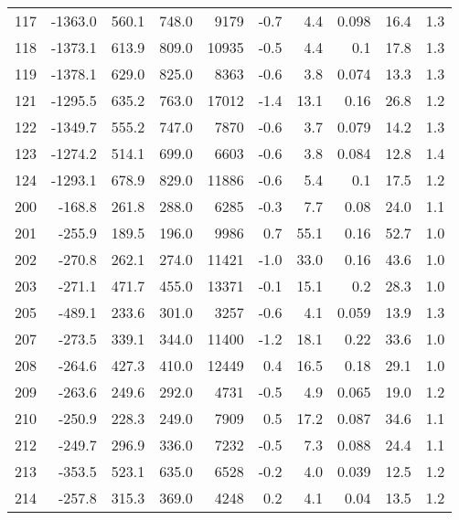 \begin{table}[ht]
\begin{tabular}{rrrrrrrrrr}
117 & -1363.0 &  560.1 &  748.0 &     9179 &    -0.7 &         4.4 & 0.098 &       16.4 &        1.3 \\
118 & -1373.1 &  613.9 &  809.0 &    10935 &    -0.5 &         4.4 &   0.1 &       17.8 &        1.3 \\
119 & -1378.1 &  629.0 &  825.0 &     8363 &    -0.6 &         3.8 & 0.074 &       13.3 &        1.3 \\
121 & -1295.5 &  635.2 &  763.0 &    17012 &    -1.4 &        13.1 &  0.16 &       26.8 &        1.2 \\
122 & -1349.7 &  555.2 &  747.0 &     7870 &    -0.6 &         3.7 & 0.079 &       14.2 &        1.3 \\
123 & -1274.2 &  514.1 &  699.0 &     6603 &    -0.6 &         3.8 & 0.084 &       12.8 &        1.4 \\
124 & -1293.1 &  678.9 &  829.0 &    11886 &    -0.6 &         5.4 &   0.1 &       17.5 &        1.2 \\
200 &  -168.8 &  261.8 &  288.0 &     6285 &    -0.3 &         7.7 &  0.08 &       24.0 &        1.1 \\
201 &  -255.9 &  189.5 &  196.0 &     9986 &     0.7 &        55.1 &  0.16 &       52.7 &        1.0 \\
202 &  -270.8 &  262.1 &  274.0 &    11421 &    -1.0 &        33.0 &  0.16 &       43.6 &        1.0 \\
203 &  -271.1 &  471.7 &  455.0 &    13371 &    -0.1 &        15.1 &   0.2 &       28.3 &        1.0 \\
205 &  -489.1 &  233.6 &  301.0 &     3257 &    -0.6 &         4.1 & 0.059 &       13.9 &        1.3 \\
207 &  -273.5 &  339.1 &  344.0 &    11400 &    -1.2 &        18.1 &  0.22 &       33.6 &        1.0 \\
208 &  -264.6 &  427.3 &  410.0 &    12449 &     0.4 &        16.5 &  0.18 &       29.1 &        1.0 \\
209 &  -263.6 &  249.6 &  292.0 &     4731 &    -0.5 &         4.9 & 0.065 &       19.0 &        1.2 \\
210 &  -250.9 &  228.3 &  249.0 &     7909 &     0.5 &        17.2 & 0.087 &       34.6 &        1.1 \\
212 &  -249.7 &  296.9 &  336.0 &     7232 &    -0.5 &         7.3 & 0.088 &       24.4 &        1.1 \\
213 &  -353.5 &  523.1 &  635.0 &     6528 &    -0.2 &         4.0 & 0.039 &       12.5 &        1.2 \\
214 &  -257.8 &  315.3 &  369.0 &     4248 &     0.2 &         4.1 &  0.04 &       13.5 &        1.2 \\

\end{tabular}
\end{table}
